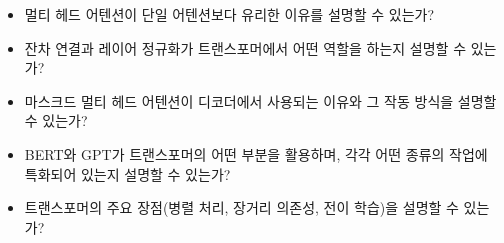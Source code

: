 \documentclass[11pt,a4paper]{article}
\theoremstyle{definition}
\begin{document}
\begin{tcolorbox}[summary, title={학습 점검 체크리스트}]
\begin{itemize}
\begin{itemize}
        \item 멀티 헤드 어텐션이 단일 어텐션보다 유리한 이유를 설명할 수 있는가?
        \item 잔차 연결과 레이어 정규화가 트랜스포머에서 어떤 역할을 하는지 설명할 수 있는가?
        \item 마스크드 멀티 헤드 어텐션이 디코더에서 사용되는 이유와 그 작동 방식을 설명할 수 있는가?
        \item BERT와 GPT가 트랜스포머의 어떤 부분을 활용하며, 각각 어떤 종류의 작업에 특화되어 있는지 설명할 수 있는가?
        \item 트랜스포머의 주요 장점(병렬 처리, 장거리 의존성, 전이 학습)을 설명할 수 있는가?
\end{itemize}
\end{itemize}
\end{tcolorbox}
\end{document}
